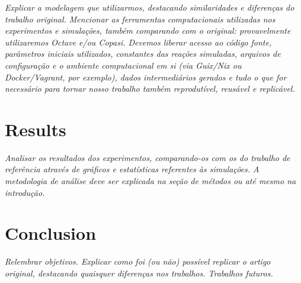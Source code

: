   \textit{Explicar a modelagem que utilizarmos, destacando similaridades e diferenças do trabalho original.
  Mencionar as ferramentas computacionais utilizadas nos experimentos e simulações, também comparando com o original: provavelmente utilizaremos \textit{Octave} e/ou \textit{Copasi}.
  Devemos liberar acesso ao código fonte, parâmetros iniciais utilizados, constantes das reações simuladas, arquivos de configuração e o ambiente computacional em si (via Guix/Nix ou Docker/Vagrant, por exemplo), dados intermediários gerados e tudo o que for necessário para tornar nosso trabalho também reprodutível, reusável e replicável.}


\section{Results}

  \textit{Analisar os resultados dos experimentos, comparando-os com os do trabalho de referência através de gráficos e estatísticas referentes às simulações.
  A metodologia de análise deve ser explicada na seção de métodos ou até mesmo na introdução.}


\section{Conclusion}


  \textit{Relembrar objetivos.
  Explicar como foi (ou não) possível replicar o artigo original, destacando quaisquer diferenças nos trabalhos.
  Trabalhos futuros.}
